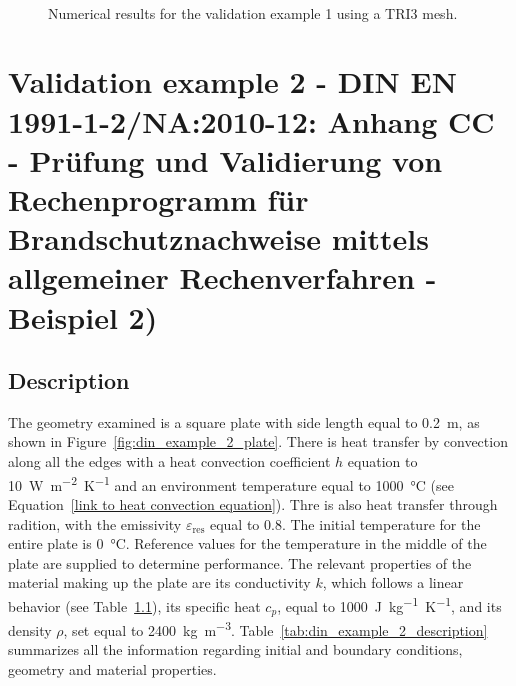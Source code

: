 \begin{figure}
   \centering
     \\
    \caption{Numerical results for the validation example 1 using a TRI3 mesh.}
    \label{fig:DIN_example_1_TRI3}
\end{figure}

\section{Validation example 2 - DIN EN 1991-1-2/NA:2010-12: Anhang CC - Prüfung und Validierung von Rechenprogramm für Brandschutznachweise mittels allgemeiner Rechenverfahren - Beispiel 2)}

\subsection{Description}

The geometry examined is a square plate with side length equal to \SI{0.2}{\meter}, as shown in Figure~\ref{fig:din_example_2_plate}.
There is heat transfer by convection along all the edges with a heat convection coefficient \(h\) equation to \SI{10}{\watt\meter^{-2}\kelvin^{-1}} and an environment temperature equal to \SI{1000}{\celsius} (see Equation~\ref{link to heat convection equation}).
Thre is also heat transfer through radition, with the emissivity \(\varepsilon_\text{res}\) equal to 0.8.
The initial temperature for the entire plate is \SI{0}{\celsius}.
Reference values for the temperature in the middle of the plate are supplied to determine performance.
The relevant properties of the material making up the plate are its conductivity \(k\), which follows a linear behavior (see Table~\ref{}), its specific heat \(c_p\), equal to \SI{1000}{\joule\kilo\gram^{-1}\kelvin^{-1}}, and its density \(\rho\), set equal to \SI{2400}{\kilo\gram\meter^{-3}}.
Table~\ref{tab:din_example_2_description} summarizes all the information regarding initial and boundary conditions, geometry and material properties.

